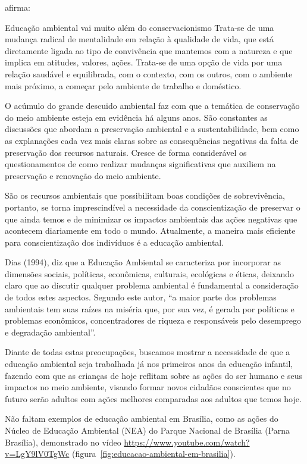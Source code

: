  afirma:

\begin{citacao}
    Educação ambiental vai muito além do conservacionismo Trata-se de uma mudança radical de mentalidade em relação à qualidade de vida, que está diretamente ligada ao tipo de convivência que mantemos com a natureza e que implica em atitudes, valores, ações. Trata-se de uma opção de vida por uma relação saudável e equilibrada, com o contexto, com os outros, com o ambiente mais próximo, a começar pelo ambiente de trabalho e doméstico.
\end{citacao}

O acúmulo do grande descuido ambiental faz com que a temática de conservação do meio ambiente esteja em evidência há alguns anos. São constantes as discussões que abordam a preservação ambiental e a sustentabilidade, bem como as explanações cada vez mais claras sobre as consequências negativas da falta de preservação dos recursos naturais. Cresce de forma considerável os questionamentos de como realizar mudanças significativas que auxiliem na preservação e renovação do meio ambiente.

São os recursos ambientais que possibilitam boas condições de sobrevivência, portanto, se torna imprescindível a necessidade da conscientização de preservar o que ainda temos e de minimizar os impactos ambientais das ações negativas que acontecem diariamente em todo o mundo.  Atualmente, a maneira mais eficiente para conscientização dos indivíduos é a educação ambiental.

Dias (1994), diz que a Educação Ambiental se caracteriza por incorporar as dimensões sociais, políticas, econômicas, culturais, ecológicas e éticas, deixando claro que ao discutir qualquer problema ambiental é fundamental a consideração de todos estes aspectos. Segundo este autor, “a maior parte dos problemas ambientais tem suas raízes na miséria que, por sua vez, é gerada por políticas e problemas econômicos, concentradores de riqueza e responsáveis pelo desemprego e degradação ambiental”.

Diante de todas estas preocupações, buscamos mostrar a necessidade de que a educação ambiental seja trabalhada já nos primeiros anos da educação infantil, fazendo com que as crianças de hoje reflitam sobre as ações do ser humano e seus impactos no meio ambiente, visando formar novos cidadãos conscientes que no futuro serão adultos com ações melhores comparadas aos adultos que temos hoje.

Não faltam exemplos de educação ambiental em Brasília, como as ações do Núcleo de Educação Ambiental (NEA) do Parque Nacional de Brasília (Parna Brasília), demonstrado no vídeo \url{https://www.youtube.com/watch?v=LgY9lV0TgWc} (figura~\ref{fig:educacao-ambiental-em-brasilia}).

